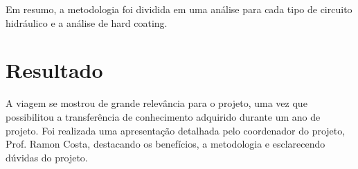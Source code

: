 \documentclass[a4paper,11pt,oneside,openany,brazilian,version=last,draft=false,]{main}
\begin{document}
\begin{twocolumn}
\begin{figure}[H]
\end{figure}

Em resumo, a metodologia foi dividida em uma análise para cada tipo de circuito
hidráulico e a análise de hard coating.

\section{Resultado}
A viagem se mostrou de grande relevância para o projeto,
uma vez que possibilitou a transferência de conhecimento adquirido durante um
ano de projeto. Foi realizada uma apresentação detalhada pelo coordenador do
projeto, Prof. Ramon Costa, destacando os benefícios, a metodologia e
esclarecendo dúvidas do projeto.
\end{twocolumn}
\end{document}
